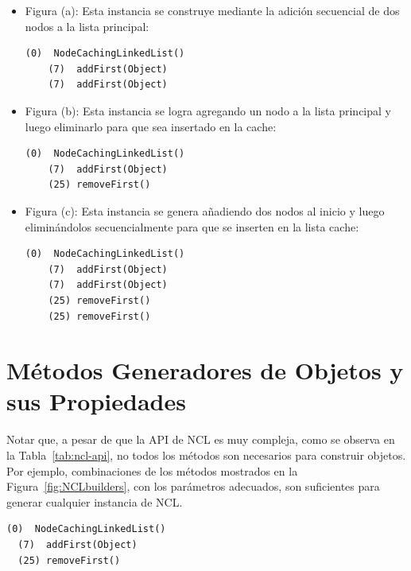 \begin{itemize}
    \item Figura (a):  
    Esta instancia se construye mediante la adición secuencial de dos nodos a la lista principal:
    \newline
    \begin{lstlisting}[numbers=none,label=fig:NCLbuilders_a,xleftmargin=0pt]
    (0)  NodeCachingLinkedList()
    (7)  addFirst(Object)
    (7)  addFirst(Object)
    \end{lstlisting}

    \item Figura (b):  
    Esta instancia se logra agregando un nodo a la lista principal y luego eliminarlo para que sea insertado en la cache:
    \newline

    \begin{lstlisting}[numbers=none,label=fig:NCLbuilders_b, xleftmargin=0pt]
    (0)  NodeCachingLinkedList()
    (7)  addFirst(Object)
    (25) removeFirst()
    \end{lstlisting}

    \item Figura (c): 
    Esta instancia se genera añadiendo dos nodos al inicio y luego eliminándolos secuencialmente para que se inserten en la lista cache:
    \newline

    \begin{lstlisting}[numbers=none,label=fig:NCLbuilders_c, xleftmargin=0pt]
    (0)  NodeCachingLinkedList()
    (7)  addFirst(Object)
    (7)  addFirst(Object)  
    (25) removeFirst()
    (25) removeFirst()
    \end{lstlisting}

\end{itemize}



\section{Métodos Generadores de Objetos y sus Propiedades}

Notar que, a pesar de que la API de NCL es muy compleja, como se observa en la Tabla~\ref{tab:ncl-api}, no todos los métodos son necesarios para construir objetos. Por ejemplo, combinaciones de los métodos mostrados en la Figura~\ref{fig:NCLbuilders}, con los parámetros adecuados, son suficientes para generar cualquier instancia de NCL.
\newline
\begin{lstlisting}[numbers=none,label=fig:NCLbuilders, caption=Conjunto de métodos generadores de objetos para NCL]
  (0)  NodeCachingLinkedList()
  (7)  addFirst(Object)
  (25) removeFirst()
\end{lstlisting}

